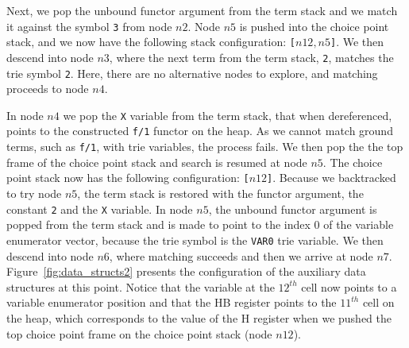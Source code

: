 Next, we pop the unbound functor argument from the term stack and we match it
against the symbol \texttt{3} from node $n2$. Node $n5$ is pushed into the choice
point stack, and we now have the following stack configuration: \texttt{[$n12,n5$]}.
We then descend into node $n3$, where the next term from the term stack, \texttt{2},
matches the trie symbol \texttt{2}. Here, there are no alternative nodes to explore,
and matching proceeds to node $n4$.

In node $n4$ we pop the \texttt{X} variable from the term stack, that when dereferenced,
points to the constructed \texttt{f/1} functor on the heap. As we cannot match ground
terms, such as \texttt{f/1}, with trie variables, the process fails. We then pop the
the top frame of the choice point stack and search is resumed at
node $n5$. The choice point stack now has the following configuration: \texttt{[$n12$]}.
Because we backtracked to try node $n5$, the term stack is restored with the functor
argument, the constant \texttt{2} and the \texttt{X} variable. In node $n5$, the unbound
functor argument is popped from the term stack and is made to point to the index 0 of the
variable enumerator vector, because the trie symbol is the \texttt{VAR0} trie variable.
We then descend into node $n6$, where matching succeeds and then we arrive at node $n7$.
Figure~\ref{fig:data_structs2} presents the configuration of the auxiliary data structures
at this point. Notice that the variable at the $12^{th}$ cell now points to a variable
enumerator position and that the HB register points to the $11^{th}$ cell on the heap, which
corresponds to the value of the H register when we pushed the top choice point frame on the
choice point stack (node $n12$).

